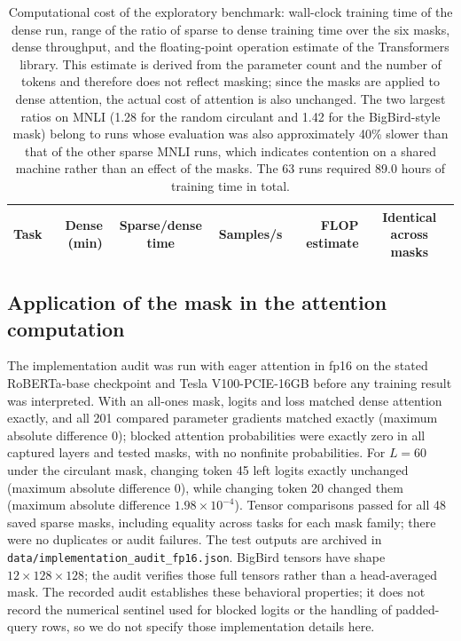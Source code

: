 \documentclass[10pt]{article}
\begin{document}
\begin{table}[H]
\centering
\caption{Computational cost of the exploratory benchmark: wall-clock training time of the dense run, range of the ratio of sparse to dense training time over the six masks, dense throughput, and the floating-point operation estimate of the Transformers library. This estimate is derived from the parameter count and the number of tokens and therefore does not reflect masking; since the masks are applied to dense attention, the actual cost of attention is also unchanged. The two largest ratios on MNLI (1.28 for the random circulant and 1.42 for the BigBird-style mask) belong to runs whose evaluation was also approximately 40\% slower than that of the other sparse MNLI runs, which indicates contention on a shared machine rather than an effect of the masks. The 63 runs required 89.0 hours of training time in total.}
\label{tab:compute}
\small
\begin{tabular}{lrcrrc}
\toprule
Task & Dense (min) & Sparse/dense time & Samples/s & FLOP estimate & Identical across masks \\
\midrule

\end{tabular}
\end{table}

\subsection{Application of the mask in the attention computation}
\label{app:maskimpl}

The implementation audit was run with eager attention in fp16 on the stated RoBERTa-base checkpoint and Tesla V100-PCIE-16GB before any training result was interpreted. With an all-ones mask, logits and loss matched dense attention exactly, and all 201 compared parameter gradients matched exactly (maximum absolute difference 0); blocked attention probabilities were exactly zero in all captured layers and tested masks, with no nonfinite probabilities. For $L=60$ under the circulant mask, changing token 45 left logits exactly unchanged (maximum absolute difference 0), while changing token 20 changed them (maximum absolute difference $1.98\times10^{-4}$). Tensor comparisons passed for all 48 saved sparse masks, including equality across tasks for each mask family; there were no duplicates or audit failures. The test outputs are archived in \texttt{data/implementation\_audit\_fp16.json}. BigBird tensors have shape $12\times128\times128$; the audit verifies those full tensors rather than a head-averaged mask. The recorded audit establishes these behavioral properties; it does not record the numerical sentinel used for blocked logits or the handling of padded-query rows, so we do not specify those implementation details here.
\end{document}
